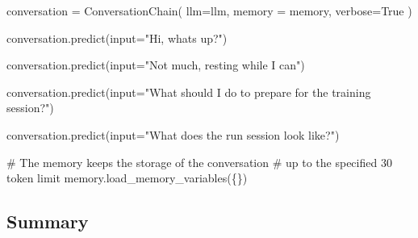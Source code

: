 \documentclass[
  letterpaper,
  DIV=11,
  numbers=noendperiod]{scrreprt}
\newenvironment{Shaded}{\begin{snugshade}}{\end{snugshade}}
\newcommand{\BuiltInTok}[1]{\textcolor[rgb]{0.00,0.23,0.31}{#1}}
\newcommand{\CommentTok}[1]{\textcolor[rgb]{0.37,0.37,0.37}{#1}}
\newcommand{\NormalTok}[1]{\textcolor[rgb]{0.00,0.23,0.31}{#1}}
\newcommand{\OperatorTok}[1]{\textcolor[rgb]{0.37,0.37,0.37}{#1}}
\newcommand{\StringTok}[1]{\textcolor[rgb]{0.13,0.47,0.30}{#1}}
\newcommand{\VariableTok}[1]{\textcolor[rgb]{0.07,0.07,0.07}{#1}}
\begin{document}
\begin{Shaded}
\begin{Highlighting}[]
\NormalTok{conversation }\OperatorTok{=}\NormalTok{ ConversationChain(}
\NormalTok{    llm}\OperatorTok{=}\NormalTok{llm,}
\NormalTok{    memory }\OperatorTok{=}\NormalTok{ memory,}
\NormalTok{    verbose}\OperatorTok{=}\VariableTok{True}
\NormalTok{)}
\end{Highlighting}
\end{Shaded}

\begin{Shaded}
\begin{Highlighting}[]
\NormalTok{conversation.predict(}\BuiltInTok{input}\OperatorTok{=}\StringTok{"Hi, what\textquotesingle{}s up?"}\NormalTok{)}
\end{Highlighting}
\end{Shaded}

\begin{Shaded}
\begin{Highlighting}[]
\NormalTok{conversation.predict(}\BuiltInTok{input}\OperatorTok{=}\StringTok{"Not much, resting while I can"}\NormalTok{)}
\end{Highlighting}
\end{Shaded}

\begin{Shaded}
\begin{Highlighting}[]
\NormalTok{conversation.predict(}\BuiltInTok{input}\OperatorTok{=}\StringTok{"What should I do to prepare for the training session?"}\NormalTok{)}
\end{Highlighting}
\end{Shaded}

\begin{Shaded}
\begin{Highlighting}[]
\NormalTok{conversation.predict(}\BuiltInTok{input}\OperatorTok{=}\StringTok{"What does the run session look like?"}\NormalTok{)}
\end{Highlighting}
\end{Shaded}

\begin{Shaded}
\begin{Highlighting}[]
\CommentTok{\# The memory keeps the storage of the conversation}
\CommentTok{\# up to the specified 30 token limit}
\NormalTok{memory.load\_memory\_variables(\{\})}
\end{Highlighting}
\end{Shaded}

\hypertarget{summary}{%
\subsection{Summary}\label{summary}}
\end{document}
